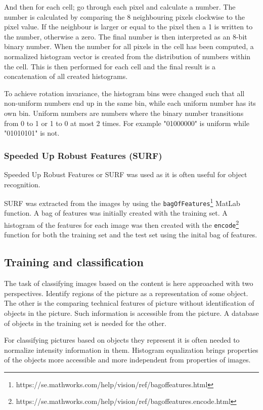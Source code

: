 \documentclass[doc/report.tex]{subfiles}
\begin{document}
And then for each cell; go through each pixel and calculate a number. The
number is calculated by comparing the 8 neighbouring pixels clockwise to the
pixel value. If the neighbour is larger or equal to the pixel then a 1 is
written to the number, otherwise a zero. The final number is then interpreted
as an 8-bit binary number. When the number for all pixels in the cell has been
computed, a normalized histogram vector is created from the distribution of
numbers within the cell. This is then performed for each cell and the final
result is a concatenation of all created histograms.

To achieve rotation invariance, the histogram bins were changed such that all
non-uniform numbers end up in the same bin, while each uniform number has its
own bin. Uniform numbers are numbers where the binary number transitions from 0
to 1 or 1 to 0 at most 2 times. For example "01000000" is uniform while
"01010101" is not.

\subsubsection{Speeded Up Robust Features (SURF)}
Speeded Up Robust Features or SURF was used as it is often useful for object
recognition.

SURF was extracted from the images by using the
\texttt{bagOfFeatures}\footnote{https://se.mathworks.com/help/vision/ref/bagoffeatures.html}
MatLab function. A bag of features was initially created with the training set.
A histogram of the features for each image was then created with the
\texttt{encode}\footnote{https://se.mathworks.com/help/vision/ref/bagoffeatures.encode.html}
function for both the training set and the test set using the inital bag of
features.




\subsection{Training and classification}
The task of classifying images based on the content is here approached with two
perspectives. Identify regions of the picture as a representation of some
object. The other is the comparing technical features of picture without
identification of objects in the picture. Such information is accessible from
the picture. A database of objects in the training set is needed for the other.

For classifying pictures based on objects they represent it is often needed to
normalize intensity information in them. Histogram equalization brings
properties of the objects more accessible and more independent from properties
of images.
\end{document}

